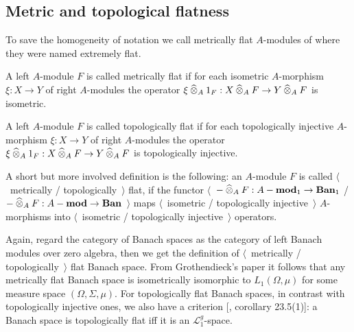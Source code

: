 
\subsection{Metric and topological flatness}
\label{SubSectionMetricAndTopologicalFlatness}

To save the homogeneity of notation we call metrically flat $A$-modules of \cite{HelMetrFlatNorMod} where they were named extremely flat.

\begin{definition}\label{MetFlatMod} A left $A$-module $F$ is called metrically flat if for each isometric $A$-morphism $\xi:X\to Y$ of right $A$-modules the operator $\xi\mathbin{\widehat{\otimes}}_{A} 1_F:X\mathbin{\widehat{\otimes}}_{A} F\to Y\mathbin{\widehat{\otimes}}_{A} F$ is isometric.
\end{definition}

\begin{definition}\label{TopFlatMod} A left $A$-module $F$ is called topologically flat if for each topologically injective $A$-morphism $\xi:X\to Y$ of right $A$-modules the operator $\xi\mathbin{\widehat{\otimes}}_{A} 1_F:X\mathbin{\widehat{\otimes}}_{A} F\to Y\mathbin{\widehat{\otimes}}_{A} F$ is topologically injective.
\end{definition}

A short but more involved definition is the following: an $A$-module $F$ is called $\langle$~metrically / topologically~$\rangle$ flat, if the functor $\langle$~$-\mathbin{\widehat{\otimes}}_{A}F:A-\mathbf{mod}_1\to\mathbf{Ban}_1$ / $-\mathbin{\widehat{\otimes}}_{A}F:A-\mathbf{mod}\to\mathbf{Ban}$~$\rangle$ maps $\langle$~isometric / topologically injective~$\rangle$ $A$-morphisms into $\langle$~isometric / topologically injective~$\rangle$ operators.

Again, regard the category of Banach spaces as the category of left Banach modules over zero algebra, then we get the definition of $\langle$~metrically / topologically~$\rangle$ flat Banach space. From Grothendieck's paper \cite{GrothMetrProjFlatBanSp} it follows that any metrically flat Banach space is isometrically isomorphic to $L_1(\Omega,\mu)$ for some measure space $(\Omega,\Sigma,\mu)$. For topologically flat Banach spaces, in contrast with topologically injective ones, we also have a criterion [\cite{DefFloTensNorOpId}, corollary 23.5(1)]: a Banach space is topologically flat iff it is an $\mathscr{L}_1^g$-space.


